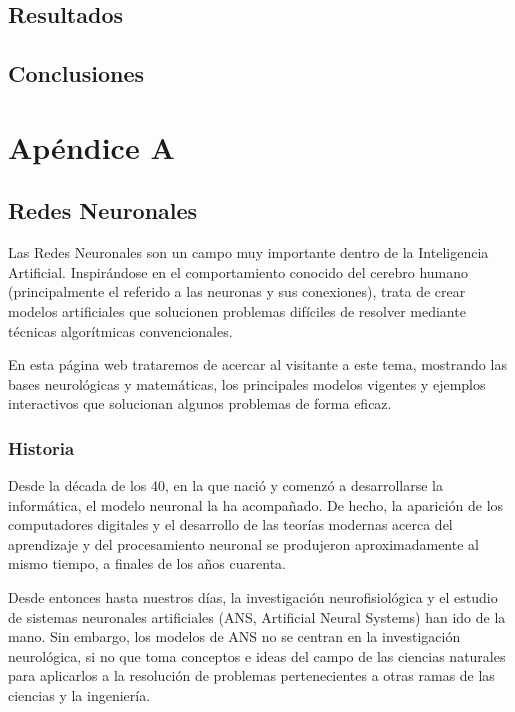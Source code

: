 \documentclass[12pt]{book} %
\begin{document}
	

\section{Resultados}

\section{Conclusiones}

\chapter*{Apéndice A}
\markboth{}{}
\thispagestyle{empty}
\lhead[\thepage]{}
\rhead[]{\thepage}
\newpage


	\section{Redes Neuronales \label{a-neuronales}}
		Las Redes Neuronales son un campo muy importante dentro de la Inteligencia Artificial. Inspirándose en el comportamiento conocido del cerebro
		humano (principalmente el referido a las neuronas y sus conexiones), trata de crear modelos artificiales que solucionen problemas difíciles de
		resolver mediante técnicas algorítmicas convencionales.  
		
		En esta página web trataremos de acercar al visitante a este tema, mostrando las bases neurológicas y matemáticas, los principales modelos 
		vigentes y ejemplos interactivos que solucionan algunos problemas de forma eficaz.
		
		\subsection{Historia}
			Desde la década de los 40, en la que nació y comenzó a desarrollarse la informática, el modelo neuronal la ha acompañado. De hecho, la
			aparición de los computadores digitales y el desarrollo de las teorías modernas acerca del aprendizaje y del procesamiento neuronal se
			produjeron aproximadamente al mismo tiempo, a finales de los años cuarenta.
			
			Desde entonces hasta nuestros días, la investigación neurofisiológica y el estudio de sistemas neuronales artificiales (ANS, Artificial Neural
			Systems) han ido de la mano. Sin embargo, los modelos de ANS no se centran en la investigación neurológica, si no que toma conceptos e ideas
			del campo de las ciencias naturales para aplicarlos a la resolución de problemas pertenecientes a otras ramas de las ciencias y la ingeniería.
			
\end{document}
